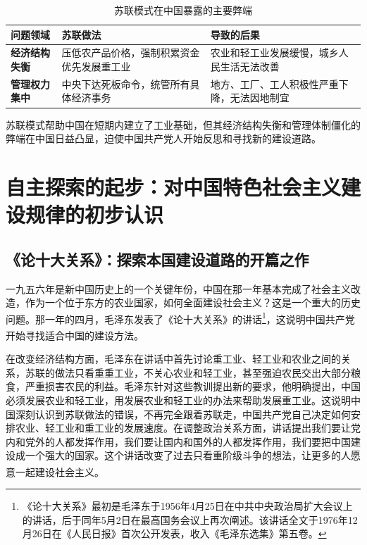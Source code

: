\documentclass[12pt, a4paper]{ctexart}
\newcommand{\upcite}[1]{\textsuperscript{\cite{#1}}}
\numberwithin{table}{section}
\numberwithin{figure}{section}
\begin{document}
\vspace{0.5em}
\begin{table}[htbp]
\centering
\caption{苏联模式在中国暴露的主要弊端}
\begin{tabularx}{0.92\textwidth}{>{\bfseries\centering\arraybackslash}p{2.2cm} X X}
\toprule
\textbf{问题领域} & \textbf{苏联做法} & \textbf{导致的后果} \\
\midrule
经济结构失衡 & 压低农产品价格，强制积累资金优先发展重工业 & 农业和轻工业发展缓慢，城乡人民生活无法改善 \\
\addlinespace
管理权力集中 & 中央下达死板命令，统管所有具体经济事务 & 地方、工厂、工人积极性严重下降，无法因地制宜 \\
\bottomrule
\end{tabularx}
\end{table}

\begin{summarybox}
苏联模式帮助中国在短期内建立了工业基础，但其经济结构失衡和管理体制僵化的弊端在中国日益凸显，迫使中国共产党人开始反思和寻找新的建设道路。
\end{summarybox}

\section{自主探索的起步：对中国特色社会主义建设规律的初步认识}
\subsection{《论十大关系》：探索本国建设道路的开篇之作}
一九五六年是新中国历史上的一个关键年份，中国在那一年基本完成了社会主义改造，作为一个位于东方的农业国家，如何全面建设社会主义？这是一个重大的历史问题。那一年的四月，毛泽东发表了《论十大关系》的讲话\footnote{《论十大关系》最初是毛泽东于1956年4月25日在中共中央政治局扩大会议上的讲话，后于同年5月2日在最高国务会议上再次阐述。该讲话全文于1976年12月26日在《人民日报》首次公开发表，收入《毛泽东选集》第五卷。}，这说明中国共产党开始寻找适合中国的建设方法\upcite{ref6}。

在改变经济结构方面，毛泽东在讲话中首先讨论重工业、轻工业和农业之间的关系，苏联的做法只看重重工业，不关心农业和轻工业，甚至强迫农民交出大部分粮食，严重损害农民的利益。毛泽东针对这些教训提出新的要求，他明确提出，中国必须发展农业和轻工业，用发展农业和轻工业的办法来帮助发展重工业。这说明中国深刻认识到苏联做法的错误，不再完全跟着苏联走，中国共产党自己决定如何安排农业、轻工业和重工业的发展速度。在调整政治关系方面，讲话提出我们要让党内和党外的人都发挥作用，我们要让国内和国外的人都发挥作用，我们要把中国建设成一个强大的国家。这个讲话改变了过去只看重阶级斗争的想法，让更多的人愿意一起建设社会主义\upcite{ref7}。
\end{document}
